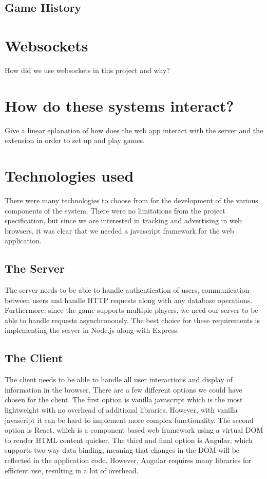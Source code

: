 \documentclass{l4proj}
\begin{document}
\subsection{Game History}

\section{Websockets}
How did we use websockets in this project and why?

\section{How do these systems interact?}
Give a linear eplanation of how does the web app interact with the server and the extension in order to set up and play games.

\section{Technologies used}
There were many technologies to choose from for the development of the various components of the system. There were no limitations from the project specification, but since we are interested in tracking and 
advertising in web browsers, it was clear that we needed a javascript framework for the web application.

\subsection{The Server}
The server needs to be able to handle authentication of users, communication between users and handle HTTP requests along with any database operations. Furthermore, since the game supports multiple players, we need
our server to be able to handle requests asynchronously. The best choice for these requirements is implementing the server in Node.js along with Express.

\subsection{The Client}
The client needs to be able to handle all user interactions and display of information in the browser. There are a few different options we could have chosen for the client. The first option is vanilla javascript which is the most lightweight
with no overhead of additional libraries. However, with vanilla javascript it can be hard to implement more complex functionality. The second option is React, which is a component based web framework using a virtual DOM to render HTML 
content quicker. The third and final option is Angular, which supports two-way data binding, meaning that changes in the DOM will be reflected in the application code. However, Angular requires many libraries for efficient use, resulting in a lot
of overhead.
\end{document}
